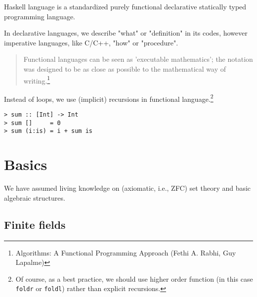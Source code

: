 \documentclass[11pt]{book}
\begin{document}
Haskell language is a standardized purely functional declarative statically typed programming language.

In declarative languages, we describe "what" or "definition" in its codes, however imperative languages, like C/C++, "how" or "procedure".
\begin{quotation}
Functional languages can be seen as 'executable mathematics'; the notation was designed to be as close as possible to the mathematical way of writing.\footnote{
Algorithms: A Functional Programming Approach (Fethi A. Rabhi, Guy Lapalme)
}
\end{quotation}
Instead of loops, we use (implicit) recursions in functional language.\footnote{Of course, as a best practice, we should use higher order function (in this case \texttt{foldr} or \texttt{foldl}) rather than explicit recursions.
}
\begin{verbatim}
> sum :: [Int] -> Int
> sum []     = 0
> sum (i:is) = i + sum is
\end{verbatim}



\chapter{Basics}
We have assumed living knowledge on (axiomatic, i.e., ZFC) set theory and basic algebraic structures.

\section{Finite fields}
\end{document}
